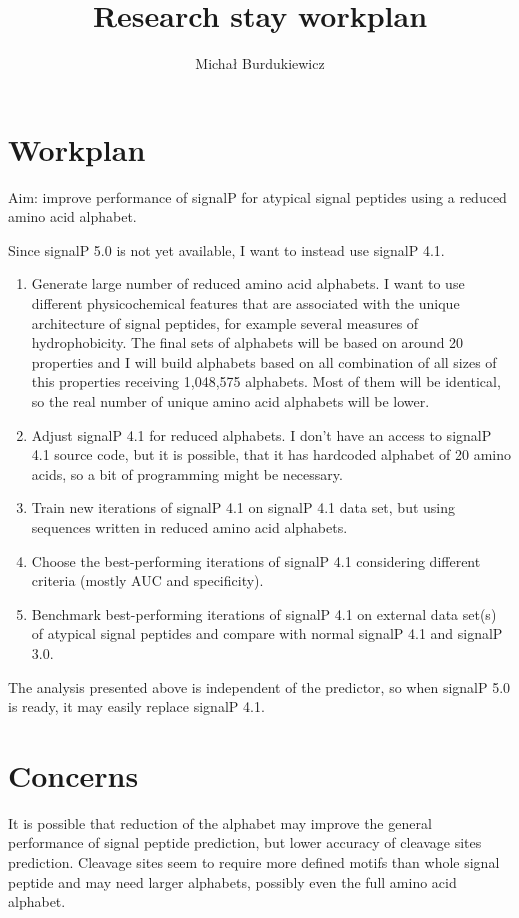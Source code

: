 \documentclass{article}
\title{Research stay workplan}
\author{Micha\l{} Burdukiewicz}
\begin{document}
\maketitle
\section{Workplan}


Aim: improve performance of signalP for atypical signal peptides using a reduced amino acid alphabet.

Since signalP 5.0 is not yet available, I want to instead use signalP 4.1. 

\begin{enumerate}
\item Generate large number of reduced amino acid alphabets. I want to use different physicochemical features that are associated with the unique architecture of signal peptides, for example several measures of hydrophobicity. The final sets of alphabets will be based on around 20 properties and I will build alphabets based on all combination of all sizes of this properties receiving 1,048,575 alphabets. Most of them will be identical, so the real number of unique amino acid alphabets will be lower.
\item Adjust signalP 4.1 for reduced alphabets. I don't have an access to signalP 4.1 source code, but it is possible, that it has hardcoded alphabet of 20 amino acids, so a bit of programming might be necessary.
\item Train new iterations of signalP 4.1 on signalP 4.1 data set, but using sequences written in reduced amino acid alphabets.
\item Choose the best-performing iterations of signalP 4.1 considering different criteria (mostly AUC and specificity).
\item Benchmark best-performing iterations of signalP 4.1 on external data set(s) of atypical signal peptides and compare with normal signalP 4.1 and signalP 3.0.
\end{enumerate}

The analysis presented above is independent of the predictor, so when signalP 5.0 is ready, it may easily replace signalP 4.1.

\section{Concerns}

It is possible that reduction of the alphabet may improve the general performance of signal peptide prediction, but lower accuracy of cleavage sites prediction. Cleavage sites seem to require more defined motifs than whole signal peptide and may need larger alphabets, possibly even the full amino acid alphabet.
\end{document}
